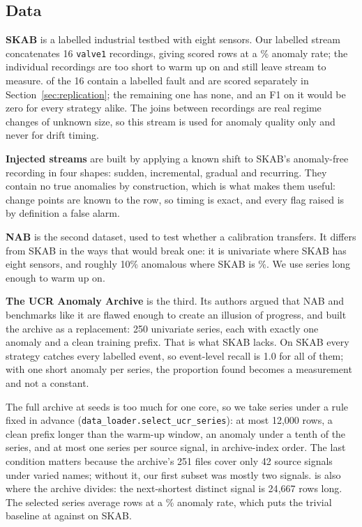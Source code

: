 \documentclass[11pt,a4paper]{article}
\begin{document}
\subsection{Data}

\textbf{SKAB} \citep{katser2020skab} is a labelled industrial testbed with eight
sensors. Our labelled stream concatenates 16 \texttt{valve1} recordings, giving
\NRows{} scored rows at a \BaseRate\% anomaly rate; the individual recordings
are too short to warm up on and still leave stream to measure. \NRecordings{}
of the 16 contain a labelled fault and are scored separately in
Section~\ref{sec:replication}; the remaining one has none, and an F1 on it
would be zero for every strategy alike. The joins between recordings are real regime changes of unknown size,
so this stream is used for anomaly quality only and never for drift timing.

\textbf{Injected streams} are built by applying a known shift to SKAB's
anomaly-free recording in four shapes: sudden, incremental, gradual and
recurring. They contain no true anomalies by construction, which is what makes
them useful: change points are known to the row, so timing is exact, and every
flag raised is by definition a false alarm.

\textbf{NAB} \citep{lavin2015nab} is the second dataset, used to test whether a
calibration transfers. It differs from SKAB in the ways that would break one: it
is univariate where SKAB has eight sensors, and roughly 10\% anomalous where
SKAB is \BaseRate\%. We use \NNabSeries{} series long enough to warm up on.

\textbf{The UCR Anomaly Archive} \citep{wu2023flawed} is the third. Its authors
argued that NAB and benchmarks like it are flawed enough to create an illusion of
progress, and built the archive as a replacement: 250 univariate series, each with
exactly one anomaly and a clean training prefix. That is what SKAB lacks. On SKAB
every strategy catches every labelled event, so event-level recall is 1.0 for all
of them; with one short anomaly per series, the proportion found becomes a
measurement and not a constant.

The full archive at \NSeeds{} seeds is too much for one core, so we take
\NUcrSeries{} series under a rule fixed in advance
(\texttt{data\_loader.select\_ucr\_series}): at most 12{,}000 rows, a clean
prefix longer than the warm-up window, an anomaly under a tenth of the series,
and at most one series per source signal, in archive-index order. The last
condition matters because the archive's 251 files cover only 42 source signals
under varied names; without it, our first subset was mostly two signals.
\NUcrSeries{} is also where the archive divides: the next-shortest distinct
signal is 24{,}667 rows long. The selected series average \UcrRows{} rows at a
\UcrBaseRate\% anomaly rate, which puts the trivial baseline at \UcrFlagAll{}
against \FlagAll{} on SKAB.
\end{document}
